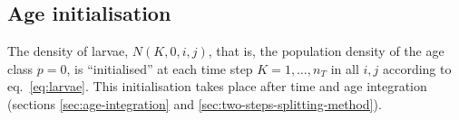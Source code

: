 
\subsection{Age initialisation}
The density of larvae, $N(K,0,i,j)$, that is, the population density of the age class $p=0$, is ``initialised'' at each time step $K=1,\dots,n_T$ in all $i,j$ according to eq.~\eqref{eq:larvae}. This initialisation takes place after time and age integration (sections \ref{sec:age-integration} and \ref{sec:two-steps-splitting-method}).


